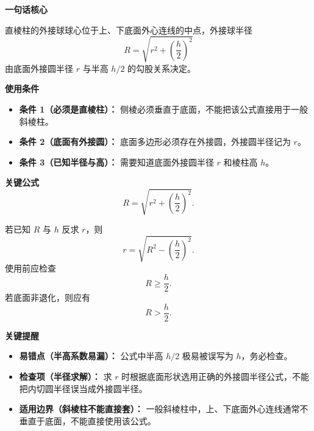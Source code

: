 \begin{summarybox}
	\textbf{\textcolor{CSummary}{一句话核心}}

	直棱柱的外接球球心位于上、下底面外心连线的中点，外接球半径
	\[
		R = \sqrt{r^{2} + \left(\frac{h}{2}\right)^{2}}
	\]
	由底面外接圆半径 $r$ 与半高 $h/2$ 的勾股关系决定。

	\medskip
	\textbf{\textcolor{CSummary}{使用条件}}
	\begin{itemize}[leftmargin=*, itemsep=0.5em, topsep=0.4em]
		\item \textbf{条件 1（必须是直棱柱）：} 侧棱必须垂直于底面，不能把该公式直接用于一般斜棱柱。
		\item \textbf{条件 2（底面有外接圆）：} 底面多边形必须存在外接圆，外接圆半径记为 $r$。
		\item \textbf{条件 3（已知半径与高）：} 需要知道底面外接圆半径 $r$ 和棱柱高 $h$。
	\end{itemize}

	\medskip
	\textbf{\textcolor{CSummary}{关键公式}}
	\[
		R = \sqrt{r^{2} + \left(\frac{h}{2}\right)^{2}}.
	\]

	若已知 $R$ 与 $h$ 反求 $r$，则
	\[
		r = \sqrt{R^{2}-\left(\frac{h}{2}\right)^{2}}.
	\]
	使用前应检查
	\[
		R\geq \frac{h}{2}.
	\]
	若底面非退化，则应有
	\[
		R>\frac{h}{2}.
	\]

	\medskip
	\textbf{\textcolor{CSummary}{关键提醒}}
	\begin{itemize}[leftmargin=*, itemsep=0.5em, topsep=0.4em]
		\item \textbf{易错点（半高系数易漏）：} 公式中半高 $h/2$ 极易被误写为 $h$，务必检查。
		\item \textbf{检查项（半径求解）：} 求 $r$ 时根据底面形状选用正确的外接圆半径公式，不能把内切圆半径误当成外接圆半径。
		\item \textbf{适用边界（斜棱柱不能直接套）：} 一般斜棱柱中，上、下底面外心连线通常不垂直于底面，不能直接使用该公式。
	\end{itemize}
\end{summarybox}